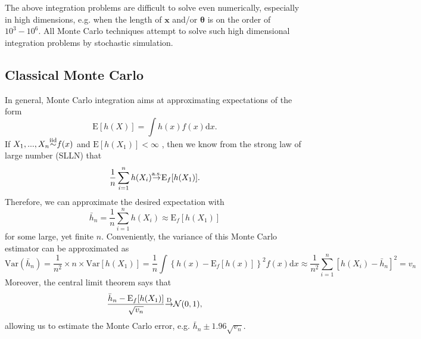 \documentclass[11pt]{article}\usepackage[]{graphicx}\usepackage[]{color}
\numberwithin{algorithm}{section}
\theoremstyle{remark}
\theoremstyle{definition}
\begin{document}
The above integration problems are difficult to solve even numerically, especially in high dimensions,
e.g. when the length of $\mathbf{x}$ and/or $\boldsymbol{\theta}$ is on the order of $10^3-10^6$.
All Monte Carlo techniques attempt to solve such high dimensional integration problems by stochastic 
simulation. 


\subsection{Classical Monte Carlo}
In general, Monte Carlo integration aims at approximating expectations 
of the form
\begin{equation}
  \text{E}[h(X)] = \int h(x) f(x) \text{d}x.
  \label{gen-int}
\end{equation}
If $X_1,...,X_n {\buildrel \text{iid} \over \sim} f(x)$ and $\text{E}[h(X_1)] < \infty$ , 
then we know from the strong law of large number (SLLN) that 
\begin{equation*}
  \frac{1}{n} \sum_{i =
    1}^ n h(X_i) {\buildrel \text{a.s.} \over \rightarrow} \text{E}_f[h(X_1)].
\end{equation*}
Therefore, we can approximate the desired expectation with 
\begin{equation*}
  \bar{h}_n = \frac{1}{n} \sum_{i=1}^ n h(X_i) \approx \text{E}_f[h(X_1)]
\end{equation*}
for some large, yet finite $n$. Conveniently, the variance of this Monte Carlo estimator can be approximated
as 
\begin{equation*}
  \text{Var}(\bar{h}_n) = \frac{1}{n^2} \times n \times \text{Var}[h(X_1)] = 
  \frac{1}{n} \int \left\{h(x) - \text{E}_{f}[h(x)]\right\}^2 f(x) \text{d}x 
  \approx \frac{1}{n^2} \sum_{i=1}^n \left[h(X_i) - \bar{h}_n\right]^2 = v_n
\end{equation*}
Moreover, the central limit theorem says that
\begin{equation*}
  \frac{\bar{h}_n - \text{E}_f[h(X_1)]}{\sqrt{v_n}} 
  {\buildrel \text{D} \over \rightarrow}  \mathcal{N}(0,1),
\end{equation*}
allowing us to estimate the Monte Carlo error, e.g. $\bar{h}_n \pm 1.96 \sqrt{v_n}$.
\end{document}
